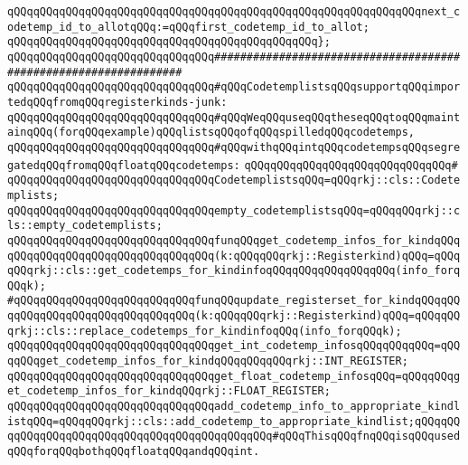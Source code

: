 \verb|qQQqqQQqqQQqqQQqqQQqqQQqqQQqqQQqqQQqqQQqqQQqqQQqqQQqqQQqqQQqqQQqnext_codetemp_id_to_allotqQQq:=qQQqfirst_codetemp_id_to_allot;|\newline
\verb|qQQqqQQqqQQqqQQqqQQqqQQqqQQqqQQqqQQqqQQqqQQqqQQq};|\newline
\newline
\newline
\newline
\verb|qQQqqQQqqQQqqQQqqQQqqQQqqQQqqQQq#################################################################|\newline
\verb|qQQqqQQqqQQqqQQqqQQqqQQqqQQqqQQq#qQQqCodetemplistsqQQqsupportqQQqimportedqQQqfromqQQqregisterkinds-junk:|\newline
\verb|qQQqqQQqqQQqqQQqqQQqqQQqqQQqqQQq#qQQqWeqQQquseqQQqtheseqQQqtoqQQqmaintainqQQq(forqQQqexample)qQQqlistsqQQqofqQQqspilledqQQqcodetemps,|\newline
\verb|qQQqqQQqqQQqqQQqqQQqqQQqqQQqqQQq#qQQqwithqQQqintqQQqcodetempsqQQqsegregatedqQQqfromqQQqfloatqQQqcodetemps:|\newline
\verb|qQQqqQQqqQQqqQQqqQQqqQQqqQQqqQQq#|\newline
\verb|qQQqqQQqqQQqqQQqqQQqqQQqqQQqqQQqCodetemplistsqQQq=qQQqrkj::cls::Codetemplists;|\newline
\newline
\verb|qQQqqQQqqQQqqQQqqQQqqQQqqQQqqQQqempty_codetemplistsqQQq=qQQqqQQqrkj::cls::empty_codetemplists;|\newline
\newline
\verb|qQQqqQQqqQQqqQQqqQQqqQQqqQQqqQQqfunqQQqget_codetemp_infos_for_kindqQQqqQQqqQQqqQQqqQQqqQQqqQQqqQQqqQQq(k:qQQqqQQqrkj::Registerkind)qQQq=qQQqqQQqrkj::cls::get_codetemps_for_kindinfoqQQqqQQqqQQqqQQqqQQq(info_forqQQqk);|\newline
\verb|#qQQqqQQqqQQqqQQqqQQqqQQqqQQqfunqQQqupdate_registerset_for_kindqQQqqQQqqQQqqQQqqQQqqQQqqQQqqQQqqQQq(k:qQQqqQQqrkj::Registerkind)qQQq=qQQqqQQqrkj::cls::replace_codetemps_for_kindinfoqQQq(info_forqQQqk);|\newline
\newline
\verb|qQQqqQQqqQQqqQQqqQQqqQQqqQQqqQQqget_int_codetemp_infosqQQqqQQqqQQq=qQQqqQQqget_codetemp_infos_for_kindqQQqqQQqqQQqrkj::INT_REGISTER;|\newline
\verb|qQQqqQQqqQQqqQQqqQQqqQQqqQQqqQQqget_float_codetemp_infosqQQq=qQQqqQQqget_codetemp_infos_for_kindqQQqrkj::FLOAT_REGISTER;|\newline
\newline
\verb|qQQqqQQqqQQqqQQqqQQqqQQqqQQqqQQqadd_codetemp_info_to_appropriate_kindlistqQQq=qQQqqQQqrkj::cls::add_codetemp_to_appropriate_kindlist;qQQqqQQqqQQqqQQqqQQqqQQqqQQqqQQqqQQqqQQqqQQqqQQq#qQQqThisqQQqfnqQQqisqQQqusedqQQqforqQQqbothqQQqfloatqQQqandqQQqint.|\newline

